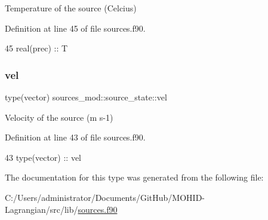 Temperature of the source (Celcius) 



Definition at line 45 of file sources.\+f90.


\begin{DoxyCode}
45         \textcolor{keywordtype}{real(prec)} :: T
\end{DoxyCode}
\mbox{\label{structsources__mod_1_1source__state_a52c6f025eb262a7a07b2a8b4ec7065ac}} 
\subsubsection{\texorpdfstring{vel}{vel}}
{\footnotesize\ttfamily type(vector) sources\+\_\+mod\+::source\+\_\+state\+::vel\hspace{0.3cm}{\ttfamily [private]}}



Velocity of the source (m s-\/1) 



Definition at line 43 of file sources.\+f90.


\begin{DoxyCode}
43         \textcolor{keywordtype}{type}(vector) :: vel
\end{DoxyCode}


The documentation for this type was generated from the following file\+:\begin{DoxyCompactItemize}
\item 
C\+:/\+Users/administrator/\+Documents/\+Git\+Hub/\+M\+O\+H\+I\+D-\/\+Lagrangian/src/lib/\mbox{\hyperlink{sources_8f90}{sources.\+f90}}\end{DoxyCompactItemize}
